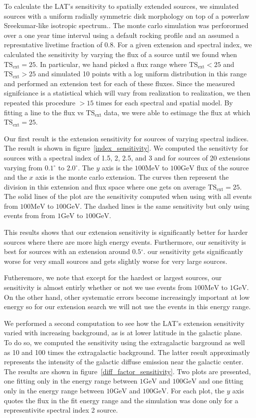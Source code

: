 \documentclass[preprint]{aastex}
\newcommand{\mev}{\text{MeV}\xspace}
\newcommand{\gev}{\text{GeV}\xspace}
\newcommand{\tsext}{{\ensuremath{\text{TS}_\text{ext}}}\xspace}
\renewcommand{\deg}{\ensuremath{^\circ}\xspace}
\begin{document}
To calculate the LAT's sensitivity to spatially extended sources,
we simulated sources with a uniform radially symmetric
disk morphology on top of a powerlaw Sreekumar-like isotropic
spectrum.\cite{Sreekumar et al. ApJ 494 pag 523 1998}.  The monte carlo
simulation was perforormed over a one year time interval using a default
rocking profile and an assumed a represntative livetime fraction of 0.8.
For a given extension and spectral index, we calculated the
sensitivity by varying the flux of a source until we found 
when $\tsext=25$. In particular, we hand picked a flux range
where $\tsext<25$ and $\tsext>25$ and simulated 10 points with
a log uniform distribution in this range and performed an extension
test for each of these fluxes. Since the measured signifciance is
a statistical which will vary from realization to realization,
we then repeated this procedure $>15$ times for each spectral
and spatial model.
By fitting a line to the flux vs $\tsext$ data, we were able to
estimage the flux at which $\tsext=25$.

Our first result is the extension sensitivity for sources of varying
spectral indices. The result is shown in figure~\ref{index_sensitivity}.
We computed the sensitivty for sources with a spectral index of 1.5,
2, 2.5, and 3 and for sources of 20 extensions varying from $0.1\deg$
to $2.0\deg$. The $y$ axis is the $100\mev$ to $100\gev$ flux of the
source and the $x$ axis is the monte carlo extension. The curves then
represent the division in this extension and flux space where one gets
on average $\tsext=25$.
The solid lines of the plot are the sensitivity computed when using
with all events from $100\mev$ to $100\gev$. The dashed lines is the
same sensitivity but only using events from from $1\gev$ to $100\gev$.

This results shows that our extension sensitivity is
significantly better for harder sources where there are more high
energy events. Furthermore, our sensitivity is best for sources with an
extension around $0.5\deg$.  our sensitivity gets significantly worse
for very small sources and gets slightly worse for very large sources.

Futheremore, we note that except for the hardest or largest sources,
our sensitivity is almost entirly whether or not we use events from
$100\mev$ to $1\gev$. On the other hand, other systematic errors become
increasingly important at low energy so for our extension search we will
not use the events in this energy range.

We performed a second computation to see how the LAT's extension
sensitivity varied with increasing background, as is at lower latitude
in the galactic plane. To do so, we computed the sensitivity using the
extragalactic barground as well as 10 and 100 times the extragalactic
background. The latter result approximatly represents the intensity of
the galactic diffuse emission near the galactic center. The results are
shown in figure~\ref{diff_factor_sensitivity}. Two plots are presented,
one fitting only in the energy range between $1\gev$ and $100\gev$ and
one fitting only in the energy range between $10\gev$ and $100\gev$. For
each plot, the $y$ axis quotes the flux in the fit energy range and the
simulation was done only for a representivite spectral index 2 source.
\end{document}
